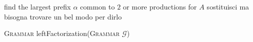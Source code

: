 \documentclass{standalone}
\begin{document}
    \begin{algorithm}[H]
        \label{alg:left-fact}
        \DontPrintSemicolon


        
         {
             {
                find the largest prefix \(\alpha\) common to \(2\) or more productions for \(A\)\;
                \If{\(\alpha \ne \varepsilon\)} {
                    sostituisci ma bisogna trovare un bel modo per dirlo
                }
            }
        }

        \caption{\textsc{Grammar} leftFactorization(\textsc{Grammar} \(\mathcal{G}\))}
    \end{algorithm}
\end{document}
